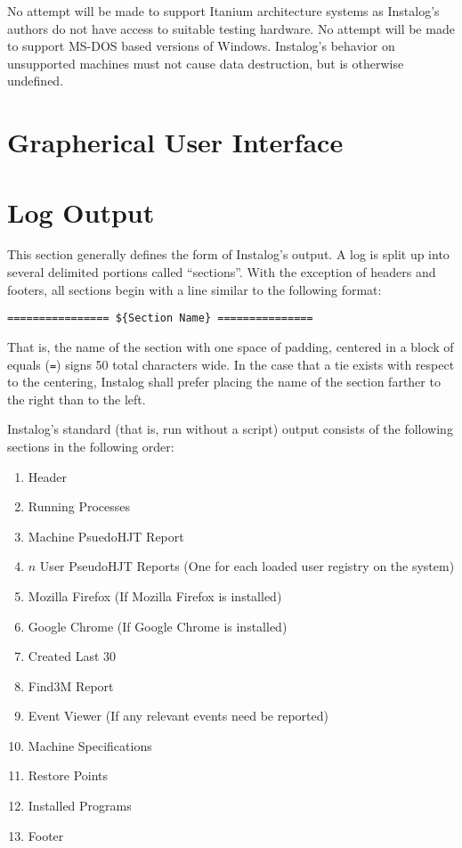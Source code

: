 \documentclass[letterpaper,12pt]{article}
\begin{document}
No attempt will be made to support Itanium architecture systems as Instalog's
authors do not have access to suitable testing hardware. No attempt will be made
to support MS-DOS based versions of Windows. Instalog's behavior on unsupported
machines must not cause data destruction, but is otherwise undefined.

\section{Grapherical User Interface}
\section{Log Output}
This section generally defines the form of Instalog's output. A log is split up
into several delimited portions called ``sections''. With the exception of
headers and footers, all sections begin with a line similar to the following
format:

\begin{verbatim}
================ ${Section Name} ===============
\end{verbatim}

That is, the name of the section with one space of padding, centered in a block
of equals (\verb|=|) signs 50 total characters wide. In the case that a tie
exists with respect to the centering, Instalog shall prefer placing the name of the
section farther to the right than to the left.

Instalog's standard (that is, run without a script) output consists of the
following sections in the following order:
\begin{enumerate}
    \item Header
    \item Running Processes
    \item Machine PsuedoHJT Report
    \item $n$ User PseudoHJT Reports (One for each loaded user registry on the
    system)
    \item Mozilla Firefox (If Mozilla Firefox is installed)
    \item Google Chrome (If Google Chrome is installed)
    \item Created Last 30
    \item Find3M Report
    \item Event Viewer (If any relevant events need be reported)
    \item Machine Specifications
    \item Restore Points
    \item Installed Programs
    \item Footer
\end{enumerate}
\end{document}
